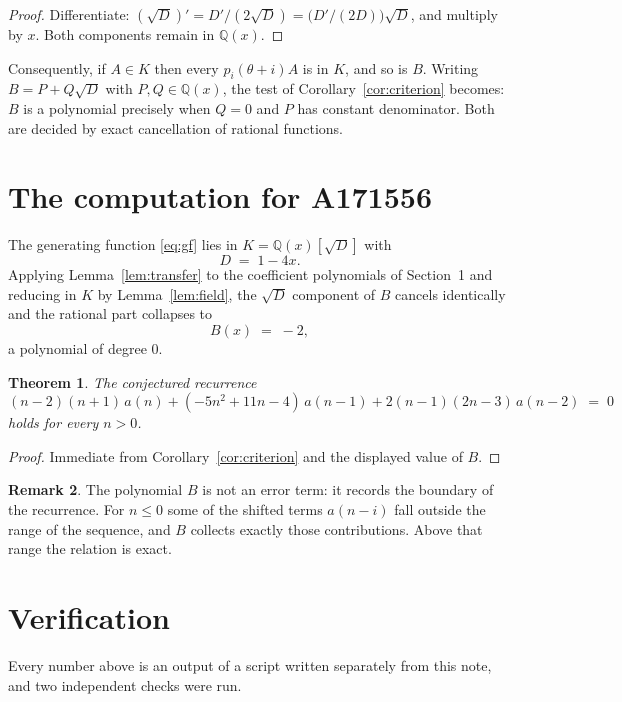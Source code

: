 \documentclass[11pt,a4paper]{article}
\theoremstyle{plain}
\newtheorem{theorem}{Theorem}
\theoremstyle{definition}
\newtheorem{remark}[theorem]{Remark}
\begin{document}
\begin{proof}
Differentiate: $(\sqrt{D})'=D'/(2\sqrt{D})=\bigl(D'/(2D)\bigr)\sqrt{D}$, and multiply by
$x$. Both components remain in $\mathbb{Q}(x)$.
\end{proof}

Consequently, if $A\in K$ then every $p_{i}(\theta+i)A$ is in $K$, and so is $B$. Writing
$B=P+Q\sqrt{D}$ with $P,Q\in\mathbb{Q}(x)$, the test of Corollary~\ref{cor:criterion}
becomes: $B$ is a polynomial precisely when $Q=0$ and $P$ has constant denominator. Both
are decided by exact cancellation of rational functions.

\section{The computation for A171556}

The generating function \eqref{eq:gf} lies in $K=\mathbb{Q}(x)[\sqrt{D}]$ with
\[
D \;=\; 1 - 4 x .
\]
Applying Lemma~\ref{lem:transfer} to the coefficient polynomials of Section~1 and reducing
in $K$ by Lemma~\ref{lem:field}, the $\sqrt{D}$ component of $B$ cancels identically and
the rational part collapses to
\[
B(x)\;=\;-2 ,
\]
a polynomial of degree $0$.

\begin{theorem}
The conjectured recurrence
\[
\left(n - 2\right) \left(n + 1\right)\,a(n) + (- 5 n^{2} + 11 n - 4)\,a(n-1) + 2 \left(n - 1\right) \left(2 n - 3\right)\,a(n-2) \;=\;0
\]
holds for every $n>0$.
\end{theorem}

\begin{proof}
Immediate from Corollary~\ref{cor:criterion} and the displayed value of $B$.
\end{proof}

\begin{remark}
The polynomial $B$ is not an error term: it records the boundary of the recurrence. For
$n\le0$ some of the shifted terms $a(n-i)$ fall outside the range of the sequence,
and $B$ collects exactly those contributions. Above that range the relation is exact.
\end{remark}

\section{Verification}

Every number above is an output of a script written separately from this note, and two
independent checks were run.
\end{document}
